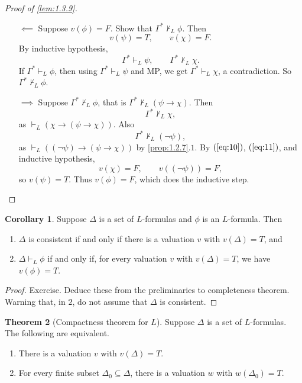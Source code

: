\documentclass{article}
\newcommand{\rb}[1]{\left( #1 \right)}
\newcommand{\notb}[1]{\rb{\neg #1}}
\newcommand{\impb}[2]{\rb{#1 \rightarrow #2}}
\theoremstyle{definition}\newtheorem{definition}{Definition}[subsection]
\theoremstyle{definition}\newtheorem{remark1}[definition]{Remark}
\theoremstyle{definition}\newtheorem{example1}[definition]{Example}
\theoremstyle{definition}\newtheorem*{remark2}{Remark}
\theoremstyle{definition}\newtheorem*{example2}{Example}
\theoremstyle{definition}\newtheorem*{note}{Note}
\theoremstyle{definition}\newtheorem*{notation}{Notation}
\newtheorem{theorem}[definition]{Theorem}
\newtheorem{corollary}[definition]{Corollary}
\begin{document}
\begin{proof}[Proof of \ref{lem:1.3.9}]
\begin{itemize}
\begin{enumerate}[leftmargin=0.5in, label=Case \arabic*.]
\begin{itemize}
\item[$ \impliedby $] Suppose $ v\rb{\phi} = F $. Show that $ \Gamma^* \not\vdash_L \phi $. Then
$$ v\rb{\psi} = T, \qquad v\rb{\chi} = F. $$
By inductive hypothesis,
$$ \Gamma^* \vdash_L \psi, \qquad \Gamma^* \not\vdash_L \chi. $$
If $ \Gamma^* \vdash_L \phi $, then using $ \Gamma^* \vdash_L \psi $ and MP, we get $ \Gamma^* \vdash_L \chi $, a contradiction. So $ \Gamma^* \not\vdash_L \phi $.
\item[$ \implies $] Suppose $ \Gamma^* \not\vdash_L \phi $, that is $ \Gamma^* \not\vdash_L \impb{\psi}{\chi} $. Then
\begin{equation}
\label{eq:10}
\Gamma^* \not\vdash_L \chi,
\end{equation}
as $ \vdash_L \impb{\chi}{\impb{\psi}{\chi}} $. Also
\begin{equation}
\label{eq:11}
\Gamma^* \not\vdash_L \notb{\psi},
\end{equation}
as $ \vdash_L \impb{\notb{\psi}}{\impb{\psi}{\chi}} $ by \ref{prop:1.2.7}.$ 1 $. By $ \rb{\ref{eq:10}} $, $ \rb{\ref{eq:11}} $, and inductive hypothesis,
$$ v\rb{\chi} = F, \qquad v\rb{\notb{\psi}} = F, $$
so $ v\rb{\psi} = T $. Thus $ v\rb{\phi} = F $, which does the inductive step.
\end{itemize}
\end{enumerate}
\end{itemize}
\end{proof}

\begin{corollary}
\label{cor:1.3.11}
Suppose $ \Delta $ is a set of $ L $-formulas and $ \phi $ is an $ L $-formula. Then
\begin{enumerate}
\item $ \Delta $ is consistent if and only if there is a valuation $ v $ with $ v\rb{\Delta} = T $, and
\item $ \Delta \vdash_L \phi $ if and only if, for every valuation $ v $ with $ v\rb{\Delta} = T $, we have $ v\rb{\phi} = T $.
\end{enumerate}
\end{corollary}

\begin{proof}
Exercise. Deduce these from the preliminaries to completeness theorem. Warning that, in $ 2 $, do not assume that $ \Delta $ is consistent.
\end{proof}

\begin{theorem}[Compactness theorem for $ L $]
Suppose $ \Delta $ is a set of $ L $-formulas. The following are equivalent.
\begin{enumerate}
\item There is a valuation $ v $ with $ v\rb{\Delta} = T $.
\item For every finite subset $ \Delta_0 \subseteq \Delta $, there is a valuation $ w $ with $ w\rb{\Delta_0} = T $.
\end{enumerate}
\end{theorem}
\end{document}
